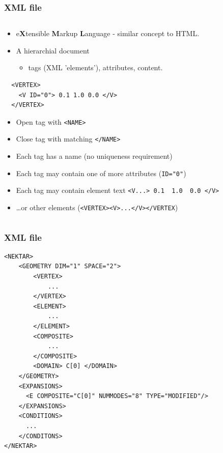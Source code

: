 \documentclass{beamer}
\numberwithin{figure}{section}
\numberwithin{equation}{section}
\begin{document}
\begin{frame}[fragile]
\frametitle{XML file}
\begin{minipage}[c][0.8\textheight][t]{\linewidth}
\begin{columns}
\begin{column}[l]{11.5cm}
\begin{itemize}
\item e\textbf{X}tensible \textbf{M}arkup \textbf{L}anguage - similar concept to
HTML.
\item A hierarchial document
\begin{itemize}
  \item tags (XML 'elements'), attributes, content.
\end{itemize}

\end{itemize}

\begin{center}
\begin{lstlisting}
  <VERTEX>
    <V ID="0"> 0.1 1.0 0.0 </V>
  </VERTEX>
\end{lstlisting}
\end{center}
\begin{itemize}
  \item Open tag with \lstinline{<NAME>}
  \item Close tag with matching \lstinline{</NAME>}
  \item Each tag has a name (no uniqueness requirement)
  \item Each tag may contain one of more attributes
  (\lstinline{ID="0"})
  \item Each tag may contain element text
  \lstinline{<V...> 0.1  1.0  0.0 </V>}
  \item \ldots or other elements (\lstinline{<VERTEX><V>...</V></VERTEX})
\end{itemize}
\end{column}
\end{columns}
\end{minipage}
\end{frame}

\begin{frame}[fragile]
\frametitle{XML file}
\begin{minipage}[c][0.8\textheight][t]{\linewidth}
\begin{lstlisting}
<NEKTAR>
    <GEOMETRY DIM="1" SPACE="2">
        <VERTEX>
            ...
        </VERTEX>
        <ELEMENT>
            ...
        </ELEMENT>
        <COMPOSITE>
            ...
        </COMPOSITE>
        <DOMAIN> C[0] </DOMAIN>
    </GEOMETRY>
    <EXPANSIONS>
      <E COMPOSITE="C[0]" NUMMODES="8" TYPE="MODIFIED"/>
    </EXPANSIONS>
    <CONDITIONS>
      ...
    </CONDITONS>
</NEKTAR>
\end{lstlisting}
\end{minipage}
\end{frame}
\end{document}
